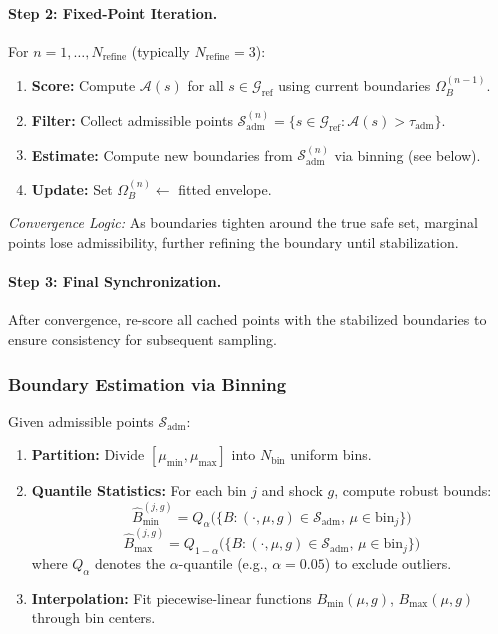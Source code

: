 \paragraph{Step 2: Fixed-Point Iteration.}
For $n = 1, \ldots, N_{\text{refine}}$ (typically $N_{\text{refine}} = 3$):
\begin{enumerate}
    \item \textbf{Score:} Compute $\mathcal{A}(s)$ for all $s \in \mathcal{G}_{\text{ref}}$ using current boundaries $\Omega_B^{(n-1)}$.
    \item \textbf{Filter:} Collect admissible points $\mathcal{S}_{\text{adm}}^{(n)} = \{s \in \mathcal{G}_{\text{ref}} : \mathcal{A}(s) > \tau_{\text{adm}}\}$.
    \item \textbf{Estimate:} Compute new boundaries from $\mathcal{S}_{\text{adm}}^{(n)}$ via binning (see below).
    \item \textbf{Update:} Set $\Omega_B^{(n)} \leftarrow$ fitted envelope.
\end{enumerate}

\textit{Convergence Logic:} As boundaries tighten around the true safe set, marginal points lose admissibility, further refining the boundary until stabilization.

\paragraph{Step 3: Final Synchronization.}
After convergence, re-score all cached points with the stabilized boundaries to ensure consistency for subsequent sampling.

\subsubsection{Boundary Estimation via Binning}
Given admissible points $\mathcal{S}_{\text{adm}}$:
\begin{enumerate}
    \item \textbf{Partition:} Divide $[\mu_{\min}, \mu_{\max}]$ into $N_{\text{bin}}$ uniform bins.
    \item \textbf{Quantile Statistics:} For each bin $j$ and shock $g$, compute robust bounds:
    \begin{equation}
        \hat{B}_{\min}^{(j,g)} = Q_\alpha\bigl(\{B : (\cdot, \mu, g) \in \mathcal{S}_{\text{adm}},\, \mu \in \text{bin}_j\}\bigr)
    \end{equation}
    \begin{equation}
        \hat{B}_{\max}^{(j,g)} = Q_{1-\alpha}\bigl(\{B : (\cdot, \mu, g) \in \mathcal{S}_{\text{adm}},\, \mu \in \text{bin}_j\}\bigr)
    \end{equation}
    where $Q_\alpha$ denotes the $\alpha$-quantile (e.g., $\alpha = 0.05$) to exclude outliers.
    \item \textbf{Interpolation:} Fit piecewise-linear functions $B_{\min}(\mu, g)$, $B_{\max}(\mu, g)$ through bin centers.
\end{enumerate}



